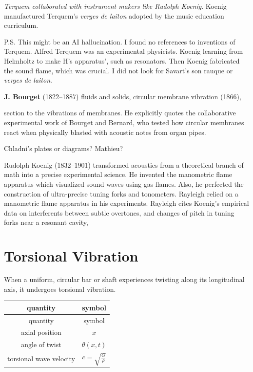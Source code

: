 \textit{ Terquem collaborated with instrument makers like Rudolph Koenig}.
Koenig manufactured Terquem's \emph{verges de laiton} adopted by
the music education curriculum.

P.S.  This might be an AI hallucination.
I found no references to inventions of Terquem.
Alfred Terquem was an experimental physicists.
Koenig learning from Helmholtz to make H's apparatus',
such as resonators.
Then Koenig fabricated the sound flame, which was crucial.
I did not look for Savart's son rauque or \emph{verges de laiton}.


\textbf{J. Bourget} (1822--1887) fluids and solids, circular membrane vibration (1866),

section to the vibrations of membranes. He explicitly quotes the
collaborative experimental work of Bourget and Bernard, who tested how
circular membranes react when physically blasted with acoustic notes
from organ pipes.

Chladni's plates or diagrams? Mathieu?

Rudolph Koenig (1832--1901) transformed acoustics from a theoretical branch of
math into a precise experimental science.  He invented the manometric flame
apparatus which visualized sound waves using gas flames.  Also, he perfected
the construction of ultra-precise tuning forks and tonometers.  Rayleigh relied
on a manometric flame apparatus in his experiments.  Rayleigh cites Koenig's
empirical data on interferents between subtle overtones, and changes of pitch
in tuning forks near a resonant cavity,

\section{Torsional Vibration}\label{torsional-vibration}

When a uniform, circular bar or shaft experiences twisting along its
longitudinal axis, it undergoes torsional vibration.


\begin{longtable}[]{@{}cc@{}}
\tabularnewline%
quantity & symbol \\
\midrule\noalign{}
\endfirsthead%
\toprule\noalign{}
quantity & symbol \\
\midrule\noalign{}
\endhead%
\endlastfoot{}%
axial position & \(x\)  \\
 angle of twist & \(\theta (x,t)\) \\
torsional wave velocity & \(c = \sqrt{\frac{G}{\rho}}\) \\
\end{longtable}

